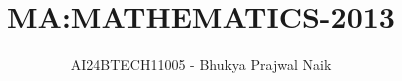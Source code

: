\documentclass[journal]{IEEEtran}
\begin{document}

\vspace{3cm}

\title{MA:MATHEMATICS-2013}
\author{AI24BTECH11005 - Bhukya Prajwal Naik
}
{\let\newpage\relax\maketitle}

\renewcommand{\thefigure}{\theenumi}
\renewcommand{\thetable}{\theenumi}
\setlength{\intextsep}{10pt} %


\renewcommand{\thetable}{\theenumi}
\end{document}
